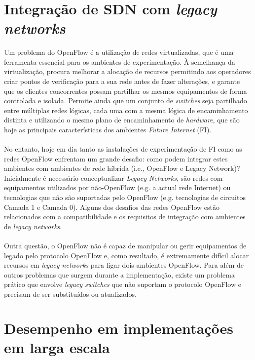 \documentclass{llncs}
\begin{document}
\section{Integração de SDN com \textit{legacy networks}}
\paragraph{}
Um problema do OpenFlow é a utilização de redes virtualizadas, que é uma ferramenta essencial para os ambientes de experimentação.
À semelhança da virtualização, procura melhorar a alocação de recursos permitindo aos operadores criar pontos de verificação para a sua rede antes de fazer alterações, e garante que os clientes concorrentes possam partilhar os mesmos equipamentos de forma controlada e isolada. 
Permite ainda que um conjunto de \textit{switches} seja partilhado entre múltiplas redes lógicas, cada uma com a mesma lógica de encaminhamento distinta e utilizando o mesmo plano de encaminhamento de \textit{hardware}, que são hoje as principais características dos ambientes \textit{Future Internet} (FI).
\paragraph{}
No entanto, hoje em dia tanto as instalações de experimentação de FI como as redes OpenFlow enfrentam um grande desafio: como podem integrar estes ambientes com ambientes de rede híbrida (i.e., OpenFlow e Legacy Network)? 
Inicialmente é necessário conceptualizar \textit{Legacy Networks}, são redes com equipamentos utilizados por não-OpenFlow (e.g. a actual rede Internet) ou tecnologias que não são suportadas pelo OpenFlow (e.g. tecnologias de circuitos Camada 1 e Camada 0). 
Alguns dos desafios das redes OpenFlow estão relacionados com a compatibilidade e os requisitos de integração com ambientes de \textit{legacy networks}.
\paragraph{}
Outra questão, o OpenFlow não é capaz de manipular ou gerir equipamentos de legado pelo protocolo OpenFlow e, como resultado, é extremamente difícil alocar recursos em \textit{legacy networks} para ligar dois ambientes OpenFlow. 
Para além de outros problemas que surgem durante a implementação, existe um problema prático que envolve \textit{ legacy switches} que não suportam o protocolo OpenFlow e precisam de ser substituídos ou atualizados.

\section{Desempenho em implementações em larga escala}
\end{document}
